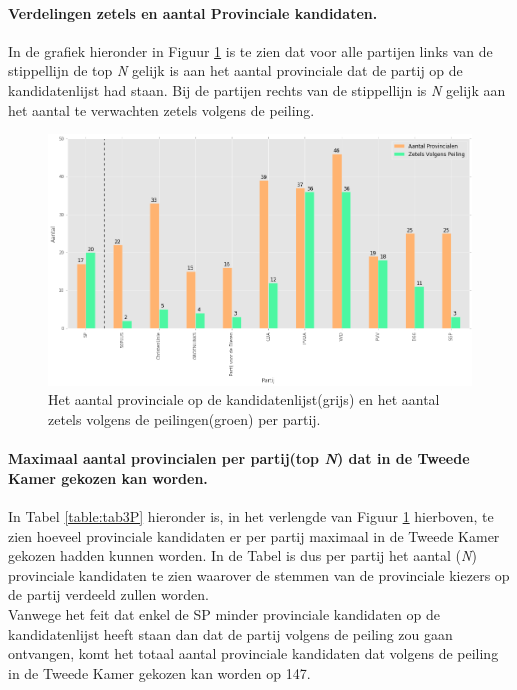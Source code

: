  
\paragraph{Verdelingen zetels en aantal Provinciale kandidaten.}
In de grafiek hieronder in Figuur \ref{fig:zetelsP} is te zien dat voor alle partijen links van de stippellijn de top \textit{N} gelijk is aan het aantal provinciale dat de partij op de kandidatenlijst had staan. Bij de partijen rechts van de stippellijn is \textit{N} gelijk aan het aantal te verwachten zetels volgens de peiling. 

 
\begin{figure}[H]

	\includegraphics[width=\linewidth]	{Aantal_provincialen_aantal_zetels1.png}

			\caption{Het aantal provinciale op de kandidatenlijst(grijs) en het aantal zetels volgens de peilingen(groen) per partij.}

\label{fig:zetelsP}
\end{figure}

\paragraph{Maximaal aantal provincialen per partij(top \textit{N}) dat in de Tweede Kamer gekozen kan worden.}
In Tabel \ref{table:tab3P} hieronder is, in het verlengde van Figuur \ref{fig:zetelsP}  hierboven, te zien hoeveel provinciale kandidaten er per partij maximaal in de Tweede Kamer gekozen hadden kunnen worden. In de Tabel is dus per partij het aantal (\textit{N}) provinciale kandidaten te zien waarover de stemmen van de provinciale kiezers op de partij verdeeld zullen worden.  
\\
\indent Vanwege het feit dat enkel de SP minder provinciale kandidaten op de kandidatenlijst heeft staan dan dat de partij volgens de peiling zou gaan ontvangen, komt het totaal aantal provinciale kandidaten dat volgens de peiling in de Tweede Kamer gekozen kan worden op 147.




